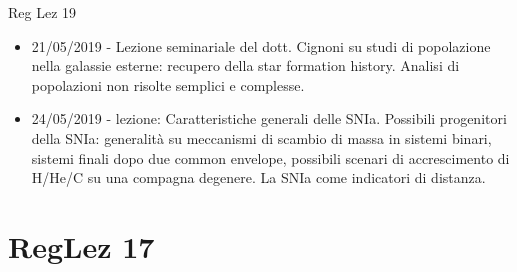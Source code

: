\begin{frame}[allowframebreaks]{Reg Lez 19}
\begin{itemize}
\item 21/05/2019 - Lezione seminariale del dott. Cignoni su studi di popolazione nella galassie esterne: recupero della star formation history. Analisi di popolazioni non risolte semplici e complesse.
\item 24/05/2019 - lezione: Caratteristiche generali delle SNIa. Possibili progenitori della SNIa: generalità su meccanismi di scambio di massa in sistemi binari, sistemi finali dopo due common envelope, possibili scenari di accrescimento di H/He/C su una compagna degenere. La SNIa come indicatori di distanza.
\end{itemize}
\end{frame}

\section{RegLez 17}

